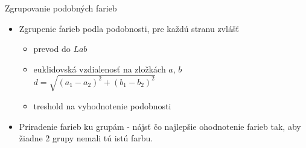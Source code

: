 \documentclass[red]{beamer}
\begin{document}
\begin{frame}{Zgrupovanie podobných farieb}
\begin{itemize}

\begin{textblock*}{2.3cm}(9.3cm,3.6cm)
\end{textblock*}

\item<1->Zgrupenie farieb podla podobnosti, pre každú stranu zvlášť
    \begin{itemize}
    \item<2-> prevod do $Lab$
    \item<3-> euklidovská vzdialenosť na zložkách $a$, $b$\\
    $ d = \sqrt{(a_1-a_2)^2+(b_1-b_2)^2} $
    \item<4-> treshold na vyhodnotenie podobnosti
    \end{itemize}
\bigskip
\item<5-> Priradenie farieb ku grupám - nájsť čo najlepšie ohodnotenie farieb tak, aby žiadne 2 grupy nemali tú istú farbu.
\end{itemize}
\end{frame}
\end{document}

